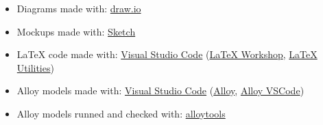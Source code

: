 \begin{itemize}
    \item Diagrams made with: \href{http://www.draw.io}{draw.io}
    \item Mockups made with: \href{https://www.sketch.com/}{Sketch}
    \item LaTeX code made with: \href{https://code.visualstudio.com/}{Visual Studio Code} (\href{https://marketplace.visualstudio.com/items?itemName=James-Yu.latex-workshop}{LaTeX Workshop}, \href{https://marketplace.visualstudio.com/items?itemName=tecosaur.latex-utilities}{LaTeX Utilities})
    \item Alloy models made with: \href{https://code.visualstudio.com/}{Visual Studio Code} (\href{https://marketplace.visualstudio.com/items?itemName=ArashSahebolamri.alloy}{Alloy}, \href{https://marketplace.visualstudio.com/items?itemName=DongyuZhao.alloy-vscode}{Alloy VSCode})
    \item Alloy models runned and checked with: \href{https://alloytools.org/}{alloytools}
\end{itemize}